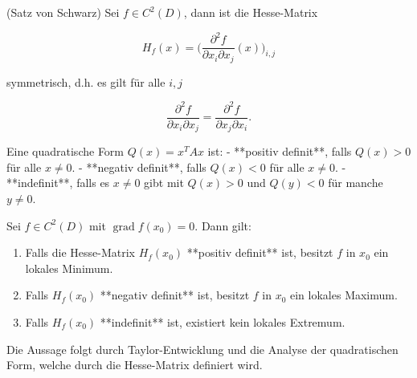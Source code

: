 \begin{satz}{}
(Satz von Schwarz)  
Sei \( f \in C^2(D) \), dann ist die Hesse-Matrix


\[
H_f(x) = \Bigg( \frac{\partial^2 f}{\partial x_i \partial x_j}(x) \Bigg)_{i,j}
\]


symmetrisch, d.h. es gilt für alle \( i,j \)


\[
\frac{\partial^2 f}{\partial x_i \partial x_j} = \frac{\partial^2 f}{\partial x_j \partial x_i}.
\]


\end{satz}

\begin{definition}{}
Eine quadratische Form \( Q(x) = x^T A x \) ist:
- **positiv definit**, falls \( Q(x) > 0 \) für alle \( x \neq 0 \).
- **negativ definit**, falls \( Q(x) < 0 \) für alle \( x \neq 0 \).
- **indefinit**, falls es \( x \neq 0 \) gibt mit \( Q(x) > 0 \) und \( Q(y) < 0 \) für manche \( y \neq 0 \).
\end{definition}

\begin{satz}{}
Sei \( f \in C^2(D) \) mit \( \operatorname{grad} f(x_0) = 0 \). Dann gilt:
\begin{enumerate}
    \item Falls die Hesse-Matrix \( H_f(x_0) \) **positiv definit** ist, besitzt \( f \) in \( x_0 \) ein lokales Minimum.
    \item Falls \( H_f(x_0) \) **negativ definit** ist, besitzt \( f \) in \( x_0 \) ein lokales Maximum.
    \item Falls \( H_f(x_0) \) **indefinit** ist, existiert kein lokales Extremum.
\end{enumerate}
\end{satz}

\begin{beweisbox}
Die Aussage folgt durch Taylor-Entwicklung und die Analyse der quadratischen Form, welche durch die Hesse-Matrix definiert wird.  
\end{beweisbox}

